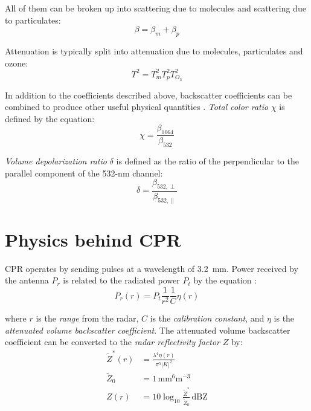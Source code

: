 \noindent All of them can be broken up into scattering due to molecules and scattering due to particulates:
\begin{equation}
\beta = \beta_m + \beta_p
\end{equation}

\noindent Attenuation is typically split into attenuation due to molecules, particulates and ozone:
\begin{equation}
T^2 = T_m^2 T_p^2 T_{O_3}^2
\end{equation}

\noindent In addition to the coefficients described above, backscatter coefficients can be combined to produce
other useful physical quantities \citep{PC-SCI-202.02}. \textit{Total color ratio} $\chi$ is defined by the equation:
\begin{equation}
\chi = \frac{\beta_{1064}}{\beta_{532}}
\end{equation}

\noindent \textit{Volume depolarization ratio} $\delta$ is defined as the ratio of the perpendicular to the parallel component of the 532-nm channel:
\begin{equation}
\delta = \frac{\beta_{532,\perp}}{\beta_{532,\parallel}}
\end{equation}

\section{Physics behind CPR}\label{sec:cpr-physics}
CPR operates by sending pulses at a wavelength of \SI{3.2}{mm}. Power received
by the antenna $P_r$ is related to the radiated power $P_t$ by the equation
\citep{1B-CPR_PDICD}:
\begin{equation}
P_r(r) = P_t \frac{1}{r^2} \frac{1}{C} \eta(r)
\end{equation}

\noindent where $r$ is the \textit{range} from the radar, $C$ is the
\textit{calibration constant}, and $\eta$ is the \textit{attenuated volume
backscatter coefficient}.
The attenuated volume backscatter coefficient
can be converted to the \textit{radar reflectivity factor} $Z$ by:
\begin{align}
\tilde{Z}^*(r) &= \frac{\lambda^4 \eta(r)}{\pi^5 |K|^2}\\
\tilde{Z}_0 &= 1 \, \mathrm{mm^6 m^{-3}}\\
Z(r) &= 10 \log_{10} \frac{\tilde{Z}^*}{\tilde{Z}_0} \, \mathrm{dBZ}
\end{align}


